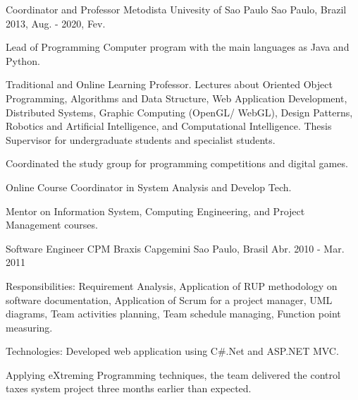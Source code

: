 \begin{cventries}
  \cventry
    {Coordinator and Professor} %
    {Metodista Univesity of Sao Paulo} %
    {Sao Paulo, Brazil} %
    {2013, Aug. - 2020, Fev.} %
    {
          \begin{cvitems} %
            \item {Lead of Programming Computer program with the main languages as Java and Python.}
            \item {Traditional and Online Learning Professor. Lectures about Oriented Object Programming, Algorithms and Data Structure, Web Application Development, Distributed Systems, Graphic Computing (OpenGL/ WebGL), Design Patterns, Robotics and Artificial Intelligence, and Computational Intelligence. Thesis Supervisor for undergraduate students and specialist students.}
            \item {Coordinated the study group for programming competitions and digital games.}
            \item {Online Course Coordinator in System Analysis and Develop Tech.}
            \item {Mentor on Information System, Computing Engineering, and Project Management courses.}
          \end{cvitems}
    }

  \cventry
    {Software Engineer} %
    {CPM Braxis Capgemini} %
    {Sao Paulo, Brasil} %
    {Abr. 2010 - Mar. 2011} %
    {
          \begin{cvitems} %
            \item {Responsibilities: Requirement Analysis, Application of RUP methodology on software documentation, Application of Scrum for a project manager, UML diagrams, Team activities planning, Team schedule managing, Function point measuring.}
            \item {Technologies: Developed web application using C\#.Net and ASP.NET MVC.}
            \item {Applying eXtreming Programming techniques, the team delivered the control taxes system project three months earlier than expected.}
          \end{cvitems}
    }


\end{cventries}
